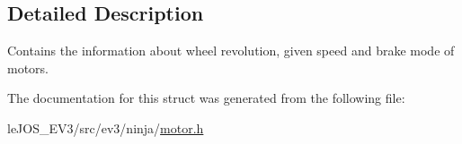 \subsection{Detailed Description}
Contains the information about wheel revolution, given speed and brake mode of motors. 

The documentation for this struct was generated from the following file\+:\begin{DoxyCompactItemize}
\item 
le\+J\+O\+S\+\_\+\+E\+V3/src/ev3/ninja/\hyperlink{motor_8h}{motor.\+h}\end{DoxyCompactItemize}
